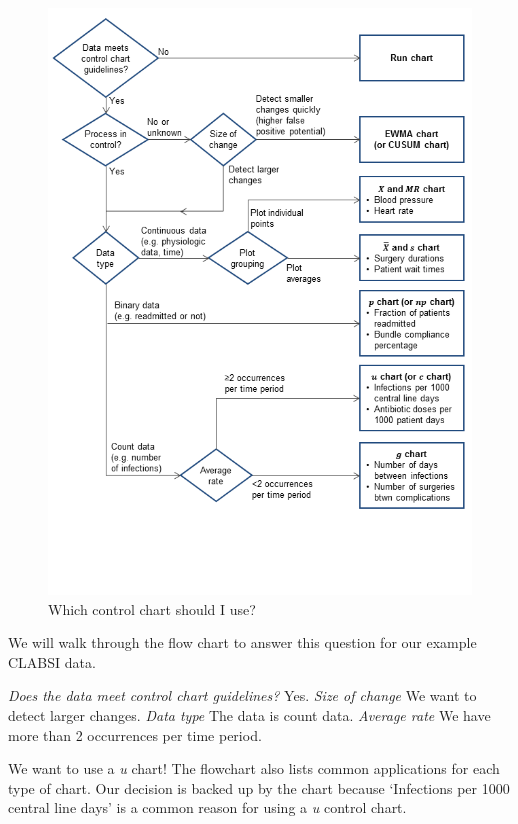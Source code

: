 \documentclass[12pt,openany]{book}
\numberwithin{dummy}{section}
\theoremstyle{ocrenumbox}
\theoremstyle{ocrenumb}
\theoremstyle{blacknumex}
\theoremstyle{blacknumbox}
\theoremstyle{ocrenum}
\begin{document}
\begin{figure}

{\centering \includegraphics{control_chart_flowchart} 

}

\caption{Which control chart should I use?}\label{fig:unnamed-chunk-2}
\end{figure}

We will walk through the flow chart to answer this question for our example CLABSI data.

\emph{Does the data meet control chart guidelines?} Yes.
\emph{Size of change} We want to detect larger changes.
\emph{Data type} The data is count data.
\emph{Average rate} We have more than 2 occurrences per time period.

We want to use a \emph{u} chart! The flowchart also lists common applications for each type of chart. Our decision is backed up by the chart because `Infections per 1000 central line days' is a common reason for using a \emph{u} control chart.
\end{document}
